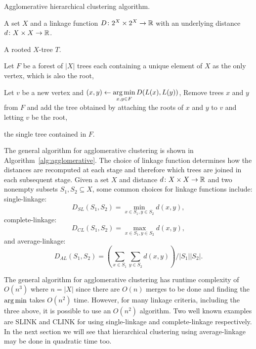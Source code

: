 \begin{algorithm}[h]
  \caption{Agglomerative hierarchical clustering algorithm.}
  \label{alg:agglomerative}

  \begin{algorithmic}
    \Require A set $X$ and a linkage function $D \colon 2^X \times 2^X \to {\mathbb R}$
    with an underlying distance $d \colon X \times X \to {\mathbb R}$.

    \Ensure  A rooted $X$-tree $T$.

    \State Let $F$ be a forest of $|X|$ trees each containing a unique element
    of $X$ as the only vertex, which is also the root,


       \State Let $v$ be a new vertex and $\displaystyle (x,y) \gets \operatorname*{arg\,min}_{x,y
         \in F} D(L(x),L(y))$,
       \State Remove trees $x$ and $y$ from $F$ and add the tree obtained by
         attaching the roots of $x$ and $y$ to $v$ and letting $v$ be the root,
    
    \EndWhile

    \State \Return the single tree contained in $F$.
    
  \end{algorithmic}
\end{algorithm}

The general algorithm for agglomerative clustering is shown in
Algorithm~\ref{alg:agglomerative}.  The choice of linkage function determines
how the distances are recomputed at each stage and therefore which trees are
joined in each subsequent stage.  Given a set $X$ and distance $d \colon X
\times X \to {\mathbb R}$ and two nonempty subsets $S_1,S_2 \subseteq X$, some common
choices for linkage functions include:\\
single-linkage:
\begin{equation*}
  \label{eq:slink}
  D_{SL}(S_1,S_2) = \min_{x \in S_1, y \in S_2} d(x,y),
\end{equation*}
complete-linkage:
\begin{equation*}
  \label{eq:clink}
  D_{CL}(S_1,S_2) = \max_{x \in S_1, y \in S_2} d(x,y),
\end{equation*}
and average-linkage:
\begin{equation*}
  \label{eq:alink}
  D_{AL}(S_1,S_2) = \left( \sum_{x \in S_1} \sum_{y \in S_2} d(x,y) \right) / |S_1| |S_2|.
\end{equation*}

The general algorithm for agglomerative clustering has runtime complexity of
$O(n^3)$ where $n = |X|$ since there are $O(n)$ merges to be done and finding
the $\operatorname*{arg\,min}$ takes $O(n^2)$ time.  However, for many linkage criteria,
including the three above, it is possible to use an $O(n^2)$ algorithm.  Two
well known examples are SLINK \cite{sibson1973slink} and CLINK
\cite{defays1977efficient} for using single-linkage and complete-linkage
respectively.  In the next section we will see that hierarchical clustering
using average-linkage may be done in quadratic time too.

